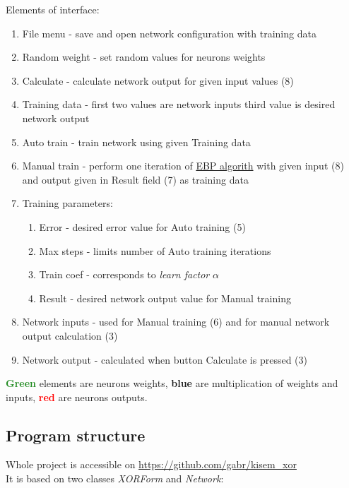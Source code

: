 Elements of interface:
\begin{enumerate}[topsep=8pt,itemsep=-1ex,partopsep=1ex,parsep=1ex]
    \item File menu - save and open network configuration with training data
    \item Random weight - set random values for neurons weights
    \item Calculate - calculate network output for given input values (8)
    \item Training data - first two values are network inputs third value is desired network output
    \item Auto train - train network using given Training data
    \item Manual train - perform one iteration of \hyperref[formula:EBP]{EBP algorith} with given input (8) and output given in Result field (7) as training data
    \item Training parameters:
    \begin{enumerate}[topsep=0pt,itemsep=-1ex,partopsep=1ex,parsep=1ex]
        \item Error - desired error value for Auto training (5)
        \item Max steps - limits number of Auto training iterations
        \item Train coef - corresponds to \textit{learn factor} $\alpha$
        \item Result - desired network output value for Manual training
    \end{enumerate}
    \item Network inputs - used for Manual training (6) and for manual network output calculation (3)
    \item Network output - calculated when button Calculate is pressed (3)
\end{enumerate}

\textcolor{ForestGreen}{\textbf{Green}} elements are neurons weights, \textcolor{Cerulean}{\textbf{blue}} are multiplication of weights and inputs, \textcolor{red}{\textbf{red}} are neurons outputs.

\subsection{Program structure}

Whole project is accessible on \url{https://github.com/gabr/kisem_xor} \\
It is based on two classes \textit{XORForm} and \textit{Network}:

